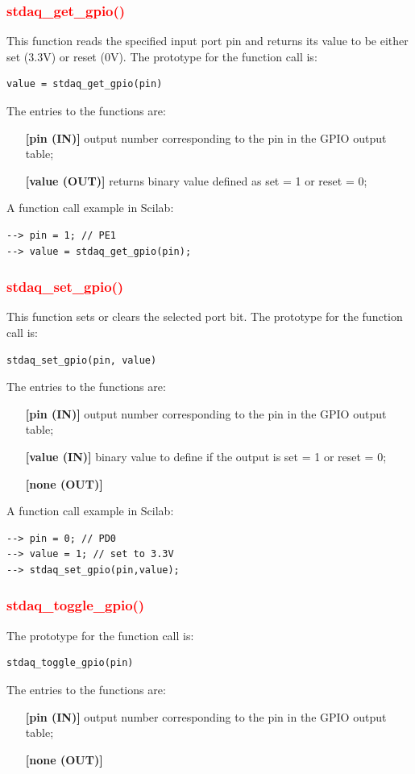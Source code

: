 \documentclass[letterpaper,10pt,english]{hitec}
\begin{document}
\subsubsection{\textcolor{red}{stdaq\_get\_gpio()}}
This function reads the specified input port pin and returns its value to be either set (3.3V) or reset (0V).
The prototype for the function call is: 
\begin{verbatim}
value = stdaq_get_gpio(pin)
\end{verbatim}
The entries to the functions are:
\begin{itemize}
\item [\textbf{[pin (IN)]}] output number corresponding to the pin in the GPIO output table;
\item [\textbf{[value (OUT)]}] returns binary value defined as set = 1 or reset = 0;
\end{itemize}
A function call example in Scilab:
\begin{verbatim}
--> pin = 1; // PE1
--> value = stdaq_get_gpio(pin);
\end{verbatim}

\subsubsection{\textcolor{red}{stdaq\_set\_gpio()}}
This function sets or clears the selected port bit.
The prototype for the function call is: 
\begin{verbatim}
stdaq_set_gpio(pin, value)
\end{verbatim}
The entries to the functions are:
\begin{itemize}
\item [\textbf{[pin (IN)]}] output number corresponding to the pin in the GPIO output table;
\item [\textbf{[value (IN)]}] binary value to define if the output is set = 1 or reset = 0;
\item [\textbf{[none (OUT)]}]
\end{itemize}
A function call example in Scilab:
\begin{verbatim}
--> pin = 0; // PD0
--> value = 1; // set to 3.3V
--> stdaq_set_gpio(pin,value);
\end{verbatim}

\subsubsection{\textcolor{red}{stdaq\_toggle\_gpio()}}
The prototype for the function call is: 
\begin{verbatim}
stdaq_toggle_gpio(pin)
\end{verbatim}
The entries to the functions are:
\begin{itemize}
\item [\textbf{[pin (IN)]}] output number corresponding to the pin in the GPIO output table;
\item [\textbf{[none (OUT)]}]
\end{itemize}
\end{document}
